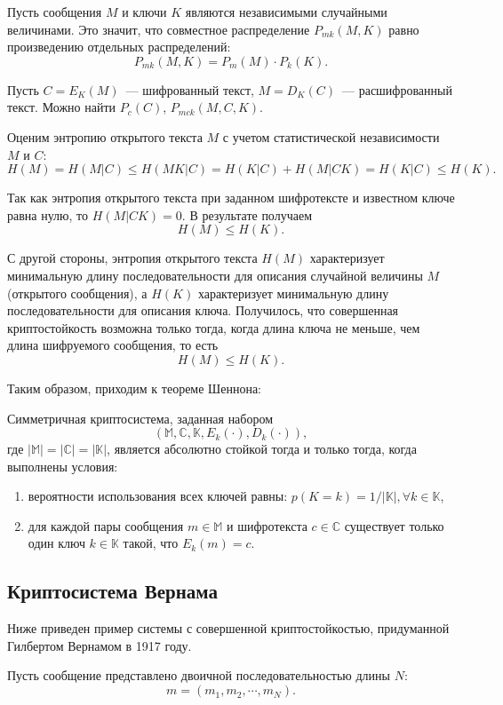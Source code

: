 Пусть сообщения $M$ и ключи $K$ являются независимыми случайными величинами. Это значит, что совместное распределение $P_{mk}(M, K)$ равно произведению отдельных распределений:
$$P_{mk}(M, K) = P_m(M) \cdot P_k(K).$$

Пусть $C = E_K(M)$~--- шифрованный текст, $M = D_K(C)$~--- расшифрованный текст. Можно найти $P_c(C)$, $P_{mck}(M, C, K).$

Оценим энтропию открытого текста $M$ с учетом статистической независимости $M$ и $C$:
$$H(M) = H(M|C) \leq H(MK|C) = H(K|C) + H(M|CK) = H(K|C) \leq H(K).$$

Так как энтропия открытого текста при заданном шифротексте и известном ключе равна нулю, то $H(M|CK) = 0$. В результате получаем
$$ H(M) \leq H(K). $$

С другой стороны, энтропия открытого текста $H(M)$ характеризует минимальную длину последовательности для описания случайной величины 
$M$ (открытого сообщения), а $H(K)$ характеризует минимальную длину последовательности для описания ключа. Получилось, что совершенная криптостойкость возможна 
только тогда, когда длина ключа не меньше, чем длина шифруемого сообщения, то есть
$$ H(M) \leq H(K). $$

Таким образом, приходим к теореме Шеннона:
\begin{theorem}
  Симметричная криптосистема, заданная набором $$ (\mathbb{M}, \mathbb{C}, \mathbb{K}, E_k(\cdot), D_k(\cdot)), $$
  где $|\mathbb{M}| = |\mathbb{C}| = |\mathbb{K}|$, является абсолютно стойкой тогда и только тогда, когда выполнены условия:
  \begin{enumerate}
    \item вероятности использования всех ключей равны: $p(K = k) = 1 / |\mathbb{K}|, \forall k \in \mathbb{K}$,
    \item для каждой пары сообщения $m \in \mathbb{M}$ и шифротекста $c \in \mathbb{C}$ существует только один ключ $k \in \mathbb{K}$ такой, что $E_k(m) = c$.
  \end{enumerate}
\end{theorem}


\subsection{Криптосистема Вернама}
Ниже приведен пример системы с совершенной криптостойкостью, придуманной Гилбертом Вернамом в 1917 году.

Пусть сообщение представлено двоичной последовательностью длины $N$:
$$ m = (m_1, m_2, \cdots, m_N). $$

